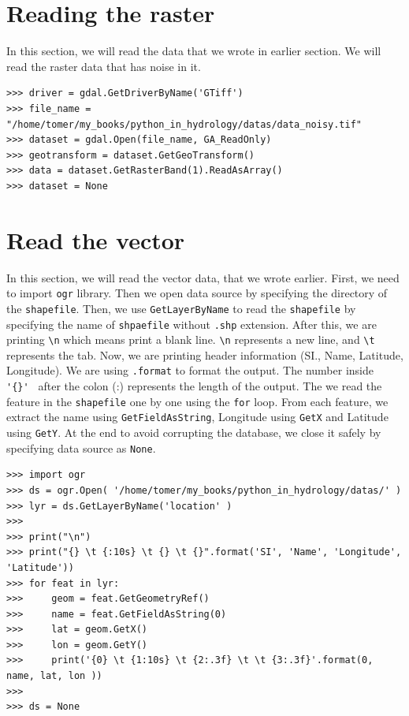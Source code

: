 \documentclass[10pt]{book}
\begin{document}
{\section{Reading the raster}
In this section, we will read the data that we wrote in earlier section. We will read the raster data that has noise in it. 
\beforeverb \begin{verbatim}
>>> driver = gdal.GetDriverByName('GTiff')
>>> file_name = "/home/tomer/my_books/python_in_hydrology/datas/data_noisy.tif"
>>> dataset = gdal.Open(file_name, GA_ReadOnly)
>>> geotransform = dataset.GetGeoTransform()
>>> data = dataset.GetRasterBand(1).ReadAsArray()
>>> dataset = None
\end{verbatim} \afterverb

\section{Read the vector}
In this section, we will read the vector data, that we wrote earlier. First, we need to import \verb"ogr" library. Then we open data source by specifying the directory of the \verb"shapefile". Then, we use \verb"GetLayerByName" to read the \verb"shapefile" by specifying the name of \verb"shpaefile" without \verb".shp" extension. After this, we are printing \verb"\n" which means print a blank line. \verb"\n" represents a new line, and \verb"\t" represents the tab. Now, we are printing header information (SI., Name, Latitude, Longitude). We are using \verb".format" to format the output. The number inside \verb" '{}' " after the colon (:) represents the length of the output. The we read the feature in the \verb"shapefile" one by one using the \verb"for" loop. From each feature, we extract the name using \verb"GetFieldAsString", Longitude using \verb"GetX" and  Latitude using \verb"GetY". At the end to avoid corrupting the database, we close it safely by specifying data source as \verb"None".

\beforeverb
\begin{verbatim}
>>> import ogr
>>> ds = ogr.Open( '/home/tomer/my_books/python_in_hydrology/datas/' )
>>> lyr = ds.GetLayerByName('location' )
>>> 
>>> print("\n")
>>> print("{} \t {:10s} \t {} \t {}".format('SI', 'Name', 'Longitude', 'Latitude'))
>>> for feat in lyr:
>>>     geom = feat.GetGeometryRef()
>>>     name = feat.GetFieldAsString(0)
>>>     lat = geom.GetX()
>>>     lon = geom.GetY()
>>>     print('{0} \t {1:10s} \t {2:.3f} \t \t {3:.3f}'.format(0, name, lat, lon ))
>>>    
>>> ds = None


\end{verbatim}}
\end{document}

